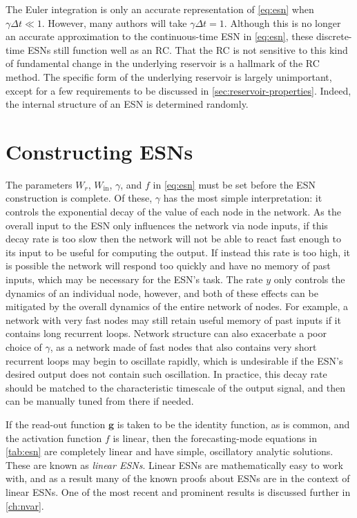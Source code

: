 The Euler integration is only an accurate representation of
\cref{eq:esn} when $\gamma \Delta t \ll 1$. However, many authors will
take $\gamma \Delta t = 1$. Although this is no longer an accurate
approximation to the continuous-time ESN in \cref{eq:esn}, these
discrete-time ESNs still function well as an RC. That the RC is not
sensitive to this kind of fundamental change in the underlying
reservoir is a hallmark of the RC method. The specific form of the
underlying reservoir is largely unimportant, except for a few
requirements to be discussed in
\cref{sec:reservoir-properties}. Indeed, the internal structure of an
ESN is determined randomly.

\section{Constructing ESNs}\label{sec:esn-construction}

The parameters $W_r$, $W_\text{in}$, $\gamma$, and $f$ in
\cref{eq:esn} must be set before the ESN construction is complete. Of
these, $\gamma$ has the most simple interpretation: it controls the
exponential decay of the value of each node in the network. As the
overall input to the ESN only influences the network via node inputs,
if this decay rate is too slow then the network will not be able to
react fast enough to its input to be useful for computing the
output. If instead this rate is too high, it is possible the network
will respond too quickly and have no memory of past inputs, which may
be necessary for the ESN's task.  The rate $y$ only controls the
dynamics of an individual node, however, and both of these effects can
be mitigated by the overall dynamics of the entire network of
nodes. For example, a network with very fast nodes may still retain
useful memory of past inputs if it contains long recurrent
loops. Network structure can also exacerbate a poor choice of
$\gamma$, as a network made of fast nodes that also contains very
short recurrent loops may begin to oscillate rapidly, which is
undesirable if the ESN's desired output does not contain such
oscillation.  In practice, this decay rate should be matched to the
characteristic timescale of the output signal, and then can be
manually tuned from there if needed.

If the read-out function $\bm{g}$ is taken to be the identity
function, as is common, and the activation function $f$ is linear,
then the forecasting-mode equations in \cref{tab:esn} are completely
linear and have simple, oscillatory analytic solutions. These are
known as \emph{linear ESNs}. Linear ESNs are mathematically easy to work
with, and as a result many of the known proofs about ESNs are in the
context of linear ESNs. One of the most recent and prominent results is
discussed further in \cref{ch:nvar}.

